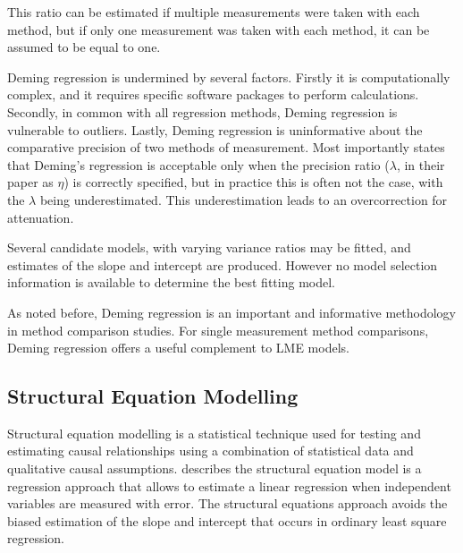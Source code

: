 \documentclass[12pt, a4paper]{report}
\theoremstyle{plain}
\theoremstyle{definition}
\theoremstyle{remark}
\begin{document}



	
This ratio can be estimated if multiple measurements were taken with each method, but if only one measurement was taken with each method, it can be assumed to be equal to one.
	

	

	
Deming regression is undermined by several factors. Firstly it is computationally complex, and it requires specific software packages to perform calculations. Secondly, in common with all regression methods, Deming regression is vulnerable to outliers. Lastly, Deming regression is uninformative about the comparative precision of two methods of measurement. Most importantly \citet{CarollRupert} states that Deming's regression is acceptable only when the precision ratio ($\lambda$, in their paper as $\eta$) is correctly specified, but in practice this is often not the case, with the $\lambda$ being underestimated. This underestimation leads to an overcorrection for attenuation.

Several candidate models, with varying variance ratios may be fitted, and estimates of the slope and intercept are produced. However no model selection information is available to determine the best fitting model.

As noted before, Deming regression is an important and informative methodology in method comparison studies. For single measurement method comparisons, Deming regression offers a useful complement to LME models.
	
\subsection{Structural Equation Modelling}
	
Structural equation modelling is a statistical technique used for testing and estimating causal relationships using a combination of statistical data and qualitative causal assumptions. \citet{carrasco2004} describes the structural equation model is a regression approach that allows to estimate a linear 
	regression when independent variables are measured with error.
	The structural equations approach avoids the biased estimation of the slope and intercept that occurs in ordinary least square regression.
	
\end{document}
